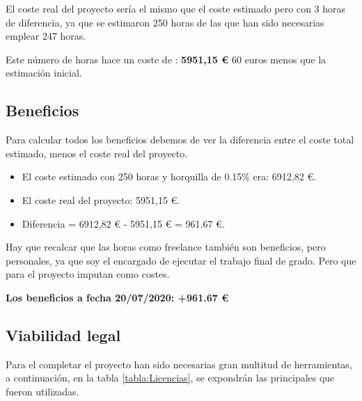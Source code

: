 El coste real del proyecto sería el mismo que el coste estimado pero con 3 horas de diferencia, ya que se estimaron 250 horas de las que han sido necesarias emplear 247 horas.

Este número de horas hace un coste de : \textbf{5951,15 €} 60 euros menos que la estimación inicial.

\subsection{Beneficios}
Para calcular todos los beneficios debemos de ver la diferencia entre el coste total estimado, menos el coste real del proyecto. 

\begin{itemize}
	\item El coste estimado con 250 horas y horquilla de 0.15\% era: 6912,82  €.
	\item El coste real del proyecto: 5951,15 €.
	\item Diferencia = 6912,82  € - 5951,15 € = 961.67 €.
\end{itemize}

Hay que recalcar que las horas como freelance también son beneficios, pero personales, ya que soy el encargado de ejecutar el trabajo final de grado. Pero que para el proyecto imputan como costes.

\textbf{Los beneficios a fecha 20/07/2020: +961.67 €}

\subsection{Viabilidad legal}

Para el completar el proyecto han sido necesarias gran multitud de herramientas, a continuación, en la tabla \ref{tabla:Licencias}, se expondrán las principales que fueron utilizadas.


